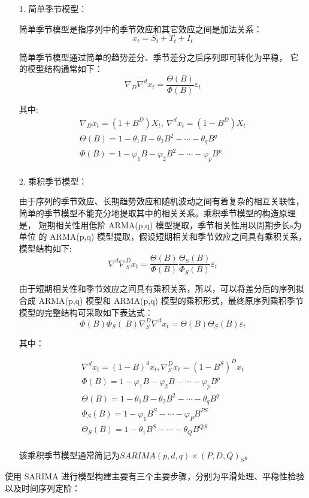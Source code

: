\documentclass[AutoFakeBold]{LZUThesis}
\begin{document}
\begin{itemize}
\item[1. ] 简单季节模型：

简单季节模型是指序列中的季节效应和其它效应之间是加法关系：
$$x_t=S_t+T_t+I_t$$

简单季节模型通过简单的趋势差分、季节差分之后序列即可转化为平稳，
它的模型结构通常如下：
$$\nabla_D\nabla^dx_t=\frac{\Theta(B)}{\Phi(B)}\varepsilon_t$$

其中:
$$
\begin{matrix}
\nabla_Dx_t=\left(1+B^D\right)X_t,{\ }\nabla^dx_t=\left(1-B^D\right)X_t\\
\Theta(B)=1-\theta_1B-\theta_2B^2-\cdots-\theta_qB^q\\
\Phi(B)=1-\varphi_1B-\varphi_2B^2-\cdots-\varphi_pB^p\\
\end{matrix}
$$

\item[2. ] 乘积季节模型：

由于序列的季节效应、长期趋势效应和随机波动之间有着复杂的相互关联性，
简单的季节模型不能充分地提取其中的相关关系。乘积季节模型的构造原理是，
短期相关性用低阶 ARMA(p,q) 模型提取，季节相关性用以周期步长s为单位
的 ARMA(p,q) 模型提取，假设短期相关和季节效应之间具有乘积关系，
模型结构如下:
$$\nabla^d\nabla_S^Dx_t=\frac{\Theta(B)}{\Phi(B)}\frac{\Theta_S(B)}{\Phi_S(B)}\varepsilon_t$$

由于短期相关性和季节效应之间具有乘积关系，所以，可以将差分后的序列拟合成 ARMA(p,q) 模型和 ARMA(p,q) 模型的乘积形式，最终原序列乘积季节模型的完整结构可采取如下表达式：
$$\Phi(B)\Phi_S(\mathrm{\ }B)\nabla_S^D\nabla^dx_t=\Theta(B)\Theta_S(B)\varepsilon_t$$

其中：

$$
\begin{matrix}
\nabla^dx_t=(1-B)^dx_t,\nabla_S^Dx_t=\left(1-B^S\right)^Dx_t\\
\Phi(B)=1-\varphi_1B-\varphi_2B-\cdots-\varphi_pB^p\\
\Theta(B)=1-\theta_1B-\theta_2B^2-\cdots-\theta_qB^q\\
\Phi_S(B)=1-\varphi_1B^S-\cdots-\varphi_PB^{PS}\\
\Theta_S(B)=1-\theta_1B^S-\cdots-\theta_QB^{QS}\\
\end{matrix}
$$

该乘积季节模型通常简记为$SARIMA(p,d,q)\times(P,D,Q)_S$。
\end{itemize}

使用 SARIMA 进行模型构建主要有三个主要步骤，分别为平滑处理、平稳性检验
以及时间序列定阶\cite{Foneone2019时间序列}：
\end{document}
